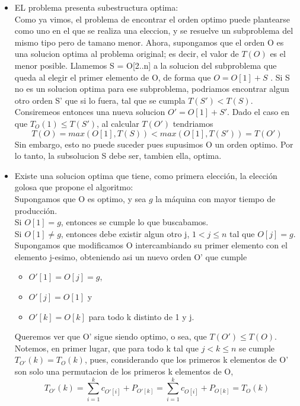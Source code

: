 \begin{itemize}
    \item EL problema presenta subestructura optima:\\
        Como ya vimos, el problema de encontrar el orden optimo puede plantearse como uno en el que se realiza una eleccion, y se resuelve un subproblema 
        del mismo tipo pero de tamano menor. 
        Ahora, supongamos que el orden O es una solucion optima al problema original; es decir, el valor de $T(O)$ es el menor posible.
        Llamemos S = O[2..n] a la solucion del subproblema que queda al elegir el primer elemento de O, de forma que $O = O[1] + S$ . 
        Si S no es un solucion optima para ese subproblema, podriamos encontrar algun otro orden S' que si lo fuera, tal que se cumpla $T(S') < T(S)$.
        Consiremeos entonces una nueva solucion $O' = O[1] + S'$. 
        Dado el caso en que $T_{O}(1) \leq T(S')$, al calcular $T(O')$ tendriamos 
        $$T(O) = max(O[1], T(S)) < max(O[1], T(S')) = T(O')$$
        Sin embargo, esto no puede suceder pues supusimos O un orden optimo. Por lo tanto, la subsolucion S debe ser, tambien ella, optima.

    \item Existe una solucion optima que tiene, como primera elecci\'on, la elecci\'on golosa que propone el algoritmo:\\
        Supongamos que O es optimo, y sea $g$ la m\'aquina con mayor tiempo de producci\'on.\\
        Si $O[1] = g$, entonces se cumple lo que buscabamos.\\
        Si $O[1] \not= g$, entonces debe existir algun otro j, $1 < j \leq n$ tal que $O[j] = g$.
        Supongamos que modificamos O intercambiando su primer elemento con el elemento j-esimo, obteniendo asi un
          nuevo orden O' que cumple
              \begin{itemize}
								\item $O'[1] = O[j] = g$, 
								\item $O'[j] = O[1]$ y
								\item $O'[k] = O[k]$ para todo k distinto de 1 y j.
							\end{itemize}
          
          Queremos ver que O' sigue siendo optimo, o sea, que $T(O') \leq T(O)$.
          Notemos, en primer lugar, que para todo k tal que $j < k \leq n$ se cumple $T_{O'}(k) =  T_{O}(k) $, pues, considerando que
          los primeros k elementos de O' son solo una permutacion de los primeros k elementos de O,
          $$ T_{O'}(k) = \sum_{i = 1}^{k}{c_{O'[i]}} + P_{O'[k]}
                                   = \sum_{i = 1}^{k}{c_{O[i]}} + P_{O[k]}
                                   = T_{O}(k)$$
          

\end{itemize}

